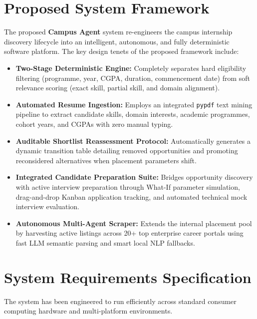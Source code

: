 \section{Proposed System Framework} \label{S3.2}
The proposed \textbf{Campus Agent} system re-engineers the campus internship discovery lifecycle into an intelligent, autonomous, and fully deterministic software platform. The key design tenets of the proposed framework include:
\begin{itemize}
	\item \textbf{Two-Stage Deterministic Engine:} Completely separates hard eligibility filtering (programme, year, CGPA, duration, commencement date) from soft relevance scoring (exact skill, partial skill, and domain alignment).
	\item \textbf{Automated Resume Ingestion:} Employs an integrated \texttt{pypdf} text mining pipeline to extract candidate skills, domain interests, academic programmes, cohort years, and CGPAs with zero manual typing.
	\item \textbf{Auditable Shortlist Reassessment Protocol:} Automatically generates a dynamic transition table detailing removed opportunities and promoting reconsidered alternatives when placement parameters shift.
	\item \textbf{Integrated Candidate Preparation Suite:} Bridges opportunity discovery with active interview preparation through What-If parameter simulation, drag-and-drop Kanban application tracking, and automated technical mock interview evaluation.
	\item \textbf{Autonomous Multi-Agent Scraper:} Extends the internal placement pool by harvesting active listings across 20+ top enterprise career portals using fast LLM semantic parsing and smart local NLP fallbacks.
\end{itemize}

\section{System Requirements Specification} \label{S3.3}
The system has been engineered to run efficiently across standard consumer computing hardware and multi-platform environments.

